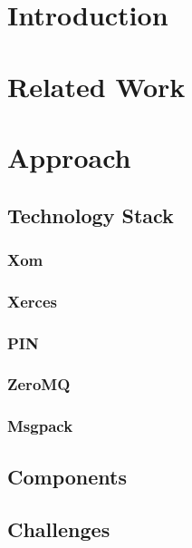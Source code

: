 \documentclass[a4paper]{scrartcl}
\begin{document}

\newpage

\newpage

\newpage
\tableofcontents
\newpage
\section{Introduction}
\section{Related Work}
\section{Approach}
\subsection{Technology Stack}
\subsubsection{Xom}
\subsubsection{Xerces}
\subsubsection{PIN}
\subsubsection{ZeroMQ}
\subsubsection{Msgpack}
\subsection{Components}
\subsection{Challenges}
\end{document}
